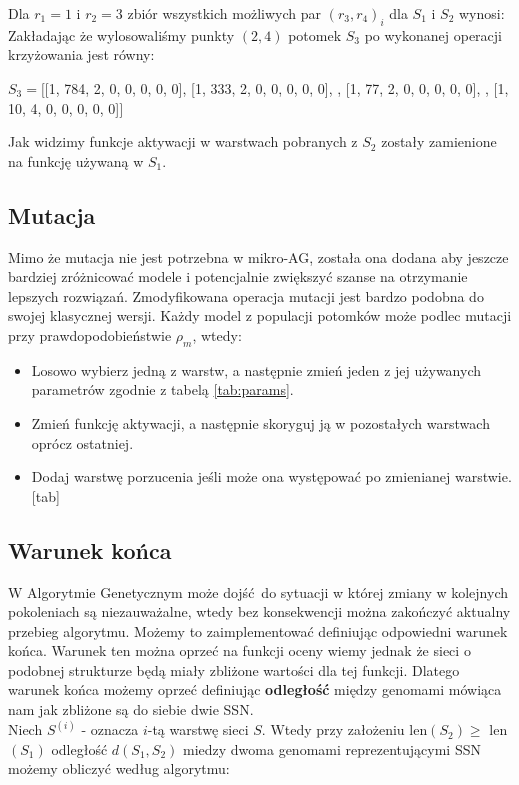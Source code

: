 \documentclass{article}
\begin{document}
Dla $r_1 = 1$ i $r_2 = 3$ zbiór wszystkich możliwych par $(r_3, r_4)_i$ dla $S_1$ i $S_2$ wynosi:
\begin{equation*}
	[(0,2),(0,4),(0,5),(1,2),(1,4),(1,5),(2,4),(2,5),(4,5)]
\end{equation*}
Zakładając że wylosowaliśmy punkty $(2,4)$ potomek $S_3$ po wykonanej operacji krzyżowania
jest równy:
\begin{center}
	$S_3 = \big[$[1, 784, 2, 0, 0, 0, 0, 0], [1, 333, 2, 0, 0, 0, 0, 0], 
	            \newline 
	            [1, 420, 2, 0, 0, 0, 0, 0], [1, 77, 2, 0, 0, 0, 0, 0], 
		    \newline 
		    [1, 100, 3, 0, 0, 0, 0, 0], [1, 10, 4, 0, 0, 0, 0, 0]$\big]$
\end{center}
Jak widzimy funkcje aktywacji w warstwach pobranych z $S_2$ zostały zamienione na funkcję
używaną w $S_1$.\\

\subsection{Mutacja}
Mimo że mutacja nie jest potrzebna w mikro-AG, została ona dodana aby jeszcze bardziej
zróżnicować modele i potencjalnie zwiększyć szanse na otrzymanie lepszych rozwiązań.
Zmodyfikowana operacja mutacji jest bardzo podobna do swojej klasycznej wersji.
Każdy model z populacji potomków może podlec mutacji przy prawdopodobieństwie $\rho_m$, wtedy:
\begin{itemize}
	\item Losowo wybierz jedną z warstw, a następnie zmień jeden z jej używanych parametrów
		zgodnie z tabelą \ref{tab:params}.
	\item Zmień funkcję aktywacji, a następnie skoryguj ją w pozostałych warstwach 
	oprócz ostatniej.
	\item Dodaj warstwę porzucenia jeśli może ona występować po zmienianej warstwie.[tab]
\end{itemize}

\subsection{Warunek końca}
W Algorytmie Genetycznym może dojść do sytuacji w której zmiany w kolejnych pokoleniach są
niezauważalne, wtedy bez konsekwencji można zakończyć aktualny przebieg algorytmu. Możemy to
zaimplementować definiując odpowiedni warunek końca. Warunek ten można oprzeć na funkcji oceny
wiemy jednak że sieci o podobnej strukturze będą miały zbliżone wartości dla tej funkcji.
Dlatego warunek końca możemy oprzeć definiując \textbf{odległość} między genomami mówiąca nam
jak zbliżone są do siebie dwie SSN.\\
Niech $S^{(i)}$ - oznacza $i$-tą warstwę sieci $S$. Wtedy przy założeniu 
len$(S_2) \geq$ len$(S_1)$
odległość $d(S_1, S_2)$ miedzy dwoma genomami reprezentującymi SSN możemy obliczyć według 
algorytmu:
\end{document}
